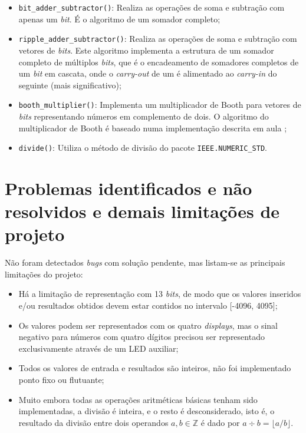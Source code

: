 \documentclass[a4paper,11pt]{article}
\begin{document}
\begin{itemize}
	\item \texttt{bit_adder_subtractor()}: Realiza as operações de soma e subtração com apenas um \textit{bit}. É o algoritmo de um somador completo;
	
	\item \texttt{ripple_adder_subtractor()}: Realiza as operações de soma e subtração com vetores de \textit{bits}. Este algoritmo implementa a estrutura de um somador completo de múltiplos \textit{bits}, que é o encadeamento de somadores completos de um \textit{bit} em cascata, onde o \textit{carry-out} de um é alimentado ao \textit{carry-in} do seguinte (mais significativo);
	
	\item \texttt{booth_multiplier()}: Implementa um multiplicador de Booth para vetores de \textit{bits} representando números em complemento de dois. O algoritmo do multiplicador de Booth é baseado numa implementação descrita em aula \cite{bacurau_booth};
	
	\item \texttt{divide()}: Utiliza o método de divisão do pacote \texttt{IEEE.NUMERIC_STD}.
	
\end{itemize}

\newpage
\section{Problemas identificados e não resolvidos e demais limitações de projeto}

Não foram detectados \textit{bugs} com solução pendente, mas listam-se as principais limitações do projeto:

\begin{itemize}
	\item Há a limitação de representação com 13 \textit{bits}, de modo que os valores inseridos e/ou resultados obtidos devem estar contidos no intervalo [-4096, 4095];
	\item Os valores podem ser representados com os quatro \textit{displays}, mas o sinal negativo para números com quatro dígitos precisou ser representado exclusivamente através de um LED auxiliar;
	\item Todos os valores de entrada e resultados são inteiros, não foi implementado ponto fixo ou flutuante;
	\item Muito embora todas as operações aritméticas básicas tenham sido implementadas, a divisão é inteira, e o resto é desconsiderado, isto é, o resultado da divisão entre dois operandos $a, b \in \mathbb{Z}$ é dado por $a \div b = \lfloor a/b \rfloor$.
\end{itemize}
\end{document}
